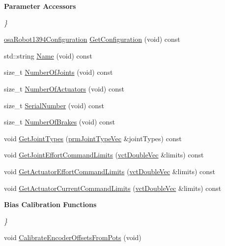 \begin{Indent}{\bf Parameter Accessors}\par
{\em \} }\begin{DoxyCompactItemize}
\item 
\hyperlink{structsaw_robot_i_o1394_1_1osa_robot1394_configuration}{osa\-Robot1394\-Configuration} \hyperlink{classsaw_robot_i_o1394_1_1osa_robot1394_adf520906bf5d183fe3df07f0f3e02023}{Get\-Configuration} (void) const 
\item 
std\-::string \hyperlink{classsaw_robot_i_o1394_1_1osa_robot1394_aec7dc72444d443fa19cc2548e7075ac4}{Name} (void) const 
\item 
size\-\_\-t \hyperlink{classsaw_robot_i_o1394_1_1osa_robot1394_a382c3409976e75099e8e88ed14eb95d7}{Number\-Of\-Joints} (void) const 
\item 
size\-\_\-t \hyperlink{classsaw_robot_i_o1394_1_1osa_robot1394_af99d3703d915a397b34633f5a5a4968d}{Number\-Of\-Actuators} (void) const 
\item 
size\-\_\-t \hyperlink{classsaw_robot_i_o1394_1_1osa_robot1394_a580fcdab820b00223c2449edae32d7ca}{Serial\-Number} (void) const 
\item 
size\-\_\-t \hyperlink{classsaw_robot_i_o1394_1_1osa_robot1394_a05a9efe49036caedb16bc435e96ad705}{Number\-Of\-Brakes} (void) const 
\item 
void \hyperlink{classsaw_robot_i_o1394_1_1osa_robot1394_a1caed838046de3d1e1c25dd7f3dbe690}{Get\-Joint\-Types} (\hyperlink{prm_joint_type_8h_a3a21392b4484e2e24aa0b73d553f940e}{prm\-Joint\-Type\-Vec} \&joint\-Types) const 
\item 
void \hyperlink{classsaw_robot_i_o1394_1_1osa_robot1394_a825ced0f4c3ac85fb55a57abeef33c8a}{Get\-Joint\-Effort\-Command\-Limits} (\hyperlink{vct_dynamic_vector_types_8h_ade4b3068c86fb88f41af2e5187e491c2}{vct\-Double\-Vec} \&limits) const 
\item 
void \hyperlink{classsaw_robot_i_o1394_1_1osa_robot1394_aac0cb2dcb0a11d0d4ee376944f8b03ab}{Get\-Actuator\-Effort\-Command\-Limits} (\hyperlink{vct_dynamic_vector_types_8h_ade4b3068c86fb88f41af2e5187e491c2}{vct\-Double\-Vec} \&limits) const 
\item 
void \hyperlink{classsaw_robot_i_o1394_1_1osa_robot1394_ab29e269479f2dd3d9e64a48d6e944107}{Get\-Actuator\-Current\-Command\-Limits} (\hyperlink{vct_dynamic_vector_types_8h_ade4b3068c86fb88f41af2e5187e491c2}{vct\-Double\-Vec} \&limits) const 
\end{DoxyCompactItemize}
\end{Indent}
\begin{Indent}{\bf Bias Calibration Functions}\par
{\em \} }\begin{DoxyCompactItemize}
\item 
void \hyperlink{classsaw_robot_i_o1394_1_1osa_robot1394_a44c554bb95c4c56aa936dc586e3cc888}{Calibrate\-Encoder\-Offsets\-From\-Pots} (void)
\end{DoxyCompactItemize}
\end{Indent}
